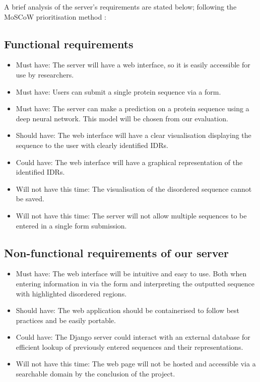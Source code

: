 \documentclass{l4proj}
\begin{document}
A brief analysis of the server’s requirements are stated below; following the MoSCoW prioritisation method \citep{moscow}: 
\label{chap:analysis sec:moscow}
\subsection{Functional requirements}

\begin{itemize}    
    \item Must have: The server will have a web interface, so it is easily accessible for use by researchers.
    \item Must have: Users can submit a single protein sequence via a form.
    \item Must have: The server can make a prediction on a protein sequence using a deep neural network. This model will be chosen from our evaluation.
    \item Should have: The web interface will have a clear visualisation displaying the sequence to the user with clearly identified IDRs.
    \item Could have: The web interface will have a graphical representation of the identified IDRs.
    \item Will not have this time: The visualisation of the disordered sequence cannot be saved.
    \item Will not have this time: The server will not allow multiple sequences to be entered in a single form submission.
\end{itemize}

\subsection{Non-functional requirements of our server}

\begin{itemize}    
    \item Must have: The web interface will be intuitive and easy to use. Both when entering information in via the form and interpreting the outputted sequence with highlighted disordered regions.
    \item Should have: The web application should be containerised to follow best practices and be easily portable.
    \item Could have: The Django server could interact with an external database for efficient lookup of previously entered sequences and their representations.
    \item Will not have this time: The web page will not be hosted and accessible via a searchable domain by the conclusion of the project.
\end{itemize}
\end{document}
